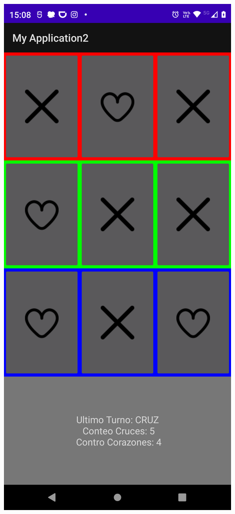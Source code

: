 \begin{frame}[fragile]
\begin{columns}
\begin{center}
\includegraphics[width=0.95\linewidth]{00_ComportamientoAplicacionTicTacToe/Etapa2_Fase2D.png}  
\end{center}
\end{columns}
\end{frame}



